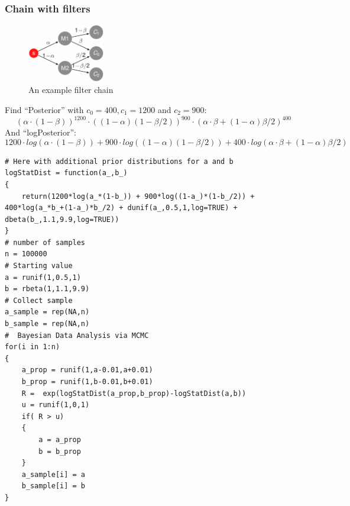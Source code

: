 \subsubsection{Chain with filters}
\begin{figure}[H]
	\centering
	\includegraphics[width=0.3\textwidth]{images/filter-chain.png}
	\caption{An example filter chain}
\end{figure}

Find ``Posterior'' with $c_0=400, $$c_1=1200$ and $c_2=900$:\\
\begin{equation*}
(\alpha\cdot (1-\beta))^{1200}\cdot((1-\alpha)(1-\beta/2))^{900}\cdot (\alpha\cdot\beta + (1-\alpha)\beta/2)^{400}
\end{equation*}
And ``logPosterior'':
\begin{equation*}
1200\cdot log(\alpha\cdot (1-\beta))+900\cdot log((1-\alpha)(1-\beta/2)) +  400\cdot log(\alpha\cdot\beta + (1-\alpha)\beta/2)
\end{equation*}
\begin{lstlisting}
# Here with additional prior distributions for a and b
logStatDist = function(a_,b_)
{
	return(1200*log(a_*(1-b_)) + 900*log((1-a_)*(1-b_/2)) + 400*log(a_*b_+(1-a_)*b_/2) + dunif(a_,0.5,1,log=TRUE) + dbeta(b_,1.1,9.9,log=TRUE))
}
# number of samples
n = 100000
# Starting value
a = runif(1,0.5,1)
b = rbeta(1,1.1,9.9)
# Collect sample
a_sample = rep(NA,n)
b_sample = rep(NA,n)
#  Bayesian Data Analysis via MCMC
for(i in 1:n)
{
	a_prop = runif(1,a-0.01,a+0.01)
	b_prop = runif(1,b-0.01,b+0.01)
	R =  exp(logStatDist(a_prop,b_prop)-logStatDist(a,b))
	u = runif(1,0,1)
	if( R > u)
	{
		a = a_prop
		b = b_prop
	}
	a_sample[i] = a
	b_sample[i] = b
}
\end{lstlisting}
